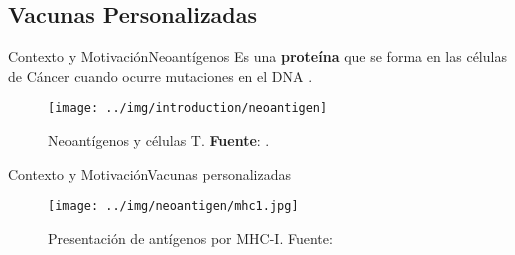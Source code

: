 \documentclass[10pt]{beamer}
\newcommand{\1}{
	\setbeamertemplate{background}{
		\texttt{[image: img/1]}
		\tikz[overlay] \fill[fill opacity=0.75,fill=white] (0,0) rectangle (-\paperwidth,\paperheight);
	}
}
\begin{document}
\subsection{Vacunas Personalizadas}




\begin{frame}{Contexto y Motivación}{Neoantígenos}
	Es una \textbf{proteína} que se forma en las células de Cáncer cuando ocurre mutaciones en el DNA  \cite{NCIdictionary2022, borden2022cancer}.
	
	\begin{figure}[]
		\centering
		\texttt{[image: ../img/introduction/neoantigen]}
		\caption{Neoantígenos y células T. \textbf{Fuente}: \cite{ucir2023}.}
	\end{figure}
\end{frame}

\begin{frame}{Contexto y Motivación}{Vacunas personalizadas}	
	\begin{figure}[H]
		\centering
		\texttt{[image: ../img/neoantigen/mhc1.jpg]}
		\caption{Presentación de antígenos por MHC-I. Fuente: \cite{zhang2019application}}
		\label{fig:mhc1}
	\end{figure}	
\end{frame}

\end{document}
